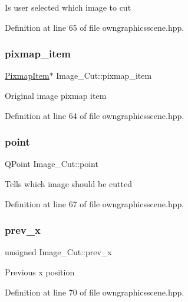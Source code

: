 Is user selected which image to cut 

Definition at line 65 of file owngraphicsscene.\+hpp.

\mbox{\label{structImage__Cut_afdafc46c968b35b63758d409ef863a8f}} 
\subsubsection{\texorpdfstring{pixmap\+\_\+item}{pixmap\_item}}
{\footnotesize\ttfamily \mbox{\hyperlink{classPixmapItem}{Pixmap\+Item}}$\ast$ Image\+\_\+\+Cut\+::pixmap\+\_\+item}

Original image pixmap item 

Definition at line 64 of file owngraphicsscene.\+hpp.

\mbox{\label{structImage__Cut_a45fc996285a5ae8ef255d66655d63df2}} 
\subsubsection{\texorpdfstring{point}{point}}
{\footnotesize\ttfamily Q\+Point Image\+\_\+\+Cut\+::point}

Tells which image should be cutted 

Definition at line 67 of file owngraphicsscene.\+hpp.

\mbox{\label{structImage__Cut_a9e6768e7bea9a60876d086d78da3c4df}} 
\subsubsection{\texorpdfstring{prev\+\_\+x}{prev\_x}}
{\footnotesize\ttfamily unsigned Image\+\_\+\+Cut\+::prev\+\_\+x}

Previous x position 

Definition at line 70 of file owngraphicsscene.\+hpp.

\mbox{\label{structImage__Cut_ad86dabb21b97270448d8db5aa7a5676f}} 
